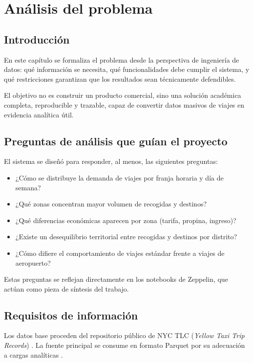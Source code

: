 \chapter{Análisis del problema}\label{cap:analisis}

\section{Introducción}
En este capítulo se formaliza el problema desde la perspectiva de ingeniería de
datos: qué información se necesita, qué funcionalidades debe cumplir el sistema,
y qué restricciones garantizan que los resultados sean técnicamente defendibles.

El objetivo no es construir un producto comercial, sino una solución académica
completa, reproducible y trazable, capaz de convertir datos masivos de viajes en
evidencia analítica útil.

\section{Preguntas de análisis que guían el proyecto}
El sistema se diseñó para responder, al menos, las siguientes preguntas:
\begin{itemize}
	\item ¿Cómo se distribuye la demanda de viajes por franja horaria y día de semana?
	\item ¿Qué zonas concentran mayor volumen de recogidas y destinos?
	\item ¿Qué diferencias económicas aparecen por zona (tarifa, propina, ingreso)?
	\item ¿Existe un desequilibrio territorial entre recogidas y destinos por distrito?
	\item ¿Cómo difiere el comportamiento de viajes estándar frente a viajes de aeropuerto?
\end{itemize}

Estas preguntas se reflejan directamente en los notebooks de Zeppelin, que actúan
como pieza de síntesis del trabajo.

\section{Requisitos de información}
Los datos base proceden del repositorio público de NYC TLC
(\textit{Yellow Taxi Trip Records}) \cite{nyctlc,nyctlcparquet}. La fuente principal
se consume en formato Parquet por su adecuación a cargas analíticas
\cite{parquetdocs}.

